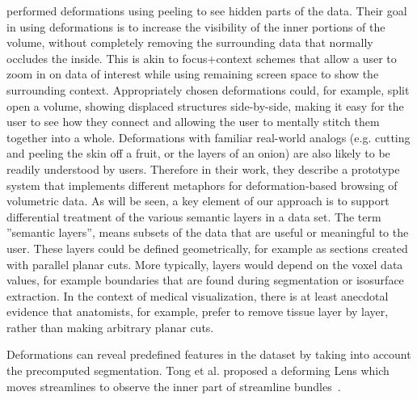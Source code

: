   
  \cite{1250400} performed deformations using peeling to see hidden parts of the data. Their goal in using deformations is to increase the visibility of
the inner portions of the volume, without completely removing the
surrounding data that normally occludes the inside. This is akin to
focus+context schemes that allow a user to zoom in on data of
interest while using remaining screen space to show the surrounding
context. Appropriately chosen deformations could, for example,
split open a volume, showing displaced structures side-by-side,
making it easy for the user to see how they connect and allowing
the user to mentally stitch them together into a whole. Deformations
with familiar real-world analogs (e.g. cutting and peeling the skin off a fruit, or the layers of an onion) are also likely to be
readily understood by users.
Therefore in their work, they describe a prototype system that implements
different metaphors for deformation-based browsing of volumetric
data. 
As will be seen, a key element of our approach is to support
differential treatment of the various semantic layers in a data set.
The term ''semantic layers'', means subsets of the data that are useful
or meaningful to the user. These layers could be defined geometrically,
for example as sections created with parallel planar cuts.
More typically, layers would depend on the voxel data values, for
example boundaries that are found during segmentation or isosurface
extraction. In the context of medical visualization, there is at
least anecdotal evidence that anatomists, for example, prefer to remove
tissue layer by layer, rather than making
arbitrary planar cuts.
 
 
Deformations can reveal predefined features in the dataset by taking into account the precomputed segmentation. Tong et al. proposed a deforming Lens which moves streamlines to observe the inner part of streamline bundles~\cite{7332955}. 

